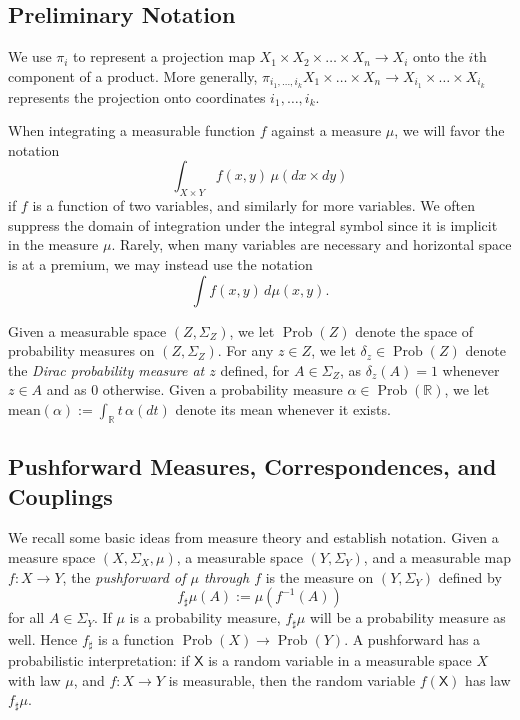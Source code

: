 \documentclass[twoside,11pt]{article}
\DeclareMathOperator{\prob}{Prob}
\begin{document}
\subsection{Preliminary Notation}

We use $\pi_i$ to represent a projection map $X_1\times X_2 \times \dots \times X_n \to X_i$ onto the $i$th component of a product. More generally, $\pi_{i_1,\dots,i_k} X_1\times \dots \times X_n \to X_{i_1}\times \dots \times X_{i_k}$ represents the projection onto coordinates $i_1, \dots, i_k$.

When integrating a measurable function $f$ against a measure $\mu$, we will favor the notation
\[\int_{X\times Y} f(x,y) \, \mu(dx\times dy)\]
if $f$ is a function of two variables, and similarly for more variables. We often suppress the domain of integration under the integral symbol since it is implicit in the measure $\mu$.
Rarely, when many variables are necessary and horizontal space is at a premium, we may instead use the notation
\[\int f(x,y) \, d\mu(x,y).\]

Given a measurable space $(Z,\Sigma_Z)$, we let $\prob(Z)$ denote the space of probability measures on $(Z,\Sigma_Z)$. 
For any $z\in Z$, we let $\delta_z \in \prob(Z)$ denote the \emph{Dirac probability measure at $z$} defined, for $A\in \Sigma_Z$, as $\delta_z(A)=1$ whenever $z\in A$ and as $0$ otherwise.
Given a probability measure $\alpha \in \prob(\mathbb{R})$, we let $\mathrm{mean}(\alpha) := \int_\mathbb{R} t\,\alpha(dt)$ denote its mean whenever it exists.



\subsection{Pushforward Measures, Correspondences, and Couplings}


We recall some basic ideas from measure theory and establish notation. Given a measure space $(X,\Sigma_X,\mu)$,  a measurable space $(Y,\Sigma_Y)$, and a measurable map $f:X\to Y$, the \emph{pushforward of $\mu$ through $f$} is the measure on $(Y,\Sigma_Y)$ defined by
\[f_\sharp \mu (A):= \mu(f^{-1}(A))\]
for all $A\in \Sigma_Y$. If $\mu$ is a probability measure, $f_\sharp \mu$ will be a probability measure as well. Hence $f_\sharp$ is a function $\prob(X) \to \prob(Y)$. A pushforward has a probabilistic interpretation: if $\mathsf X$ is a random variable in a measurable space $X$ with law $\mu$, and $f:X\to Y$ is measurable, then the random variable $f(\mathsf X)$ has law $f_\sharp \mu$.
\end{document}
